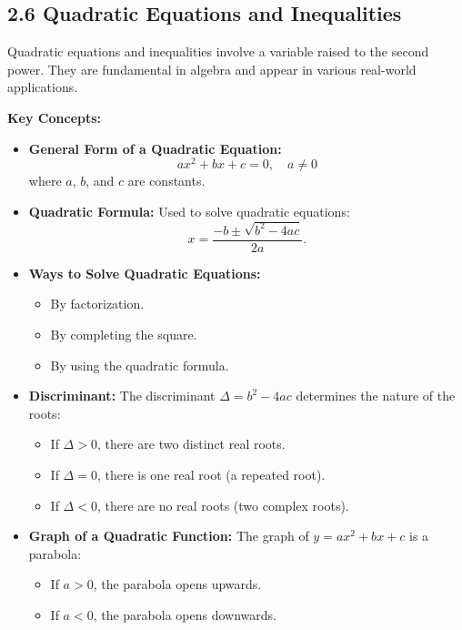 
\subsection*{2.6 Quadratic Equations and Inequalities}
Quadratic equations and inequalities involve a variable raised to the second power. They are fundamental in algebra and appear in various real-world applications.

\textbf{Key Concepts:}
\begin{itemize}
    \item \textbf{General Form of a Quadratic Equation:}
    \[
    ax^2 + bx + c = 0, \quad a \neq 0
    \]
    where $a$, $b$, and $c$ are constants.
    \item \textbf{Quadratic Formula:} Used to solve quadratic equations:
    \[
    x = \frac{-b \pm \sqrt{b^2 - 4ac}}{2a}.
    \]
    \item \textbf{Ways to Solve Quadratic Equations:}
    \begin{itemize}
        \item By factorization.
        \item By completing the square.
        \item By using the quadratic formula.
    \end{itemize}
    \item \textbf{Discriminant:} The discriminant $\Delta = b^2 - 4ac$ determines the nature of the roots:
    \begin{itemize}
        \item If $\Delta > 0$, there are two distinct real roots.
        \item If $\Delta = 0$, there is one real root (a repeated root).
        \item If $\Delta < 0$, there are no real roots (two complex roots).
    \end{itemize}
    \item \textbf{Graph of a Quadratic Function:} The graph of $y = ax^2 + bx + c$ is a parabola:
    \begin{itemize}
        \item If $a > 0$, the parabola opens upwards.
        \item If $a < 0$, the parabola opens downwards.
        

\end{itemize}
\end{itemize}
